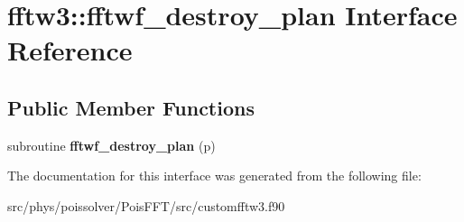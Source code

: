\hypertarget{interfacefftw3_1_1fftwf__destroy__plan}{}\section{fftw3\+:\+:fftwf\+\_\+destroy\+\_\+plan Interface Reference}
\label{interfacefftw3_1_1fftwf__destroy__plan}
\subsection*{Public Member Functions}
\begin{DoxyCompactItemize}
\item 
subroutine {\bfseries fftwf\+\_\+destroy\+\_\+plan} (p)\hypertarget{interfacefftw3_1_1fftwf__destroy__plan_a533e8119a5fcd6a6e9fa0b0e79653a63}{}\label{interfacefftw3_1_1fftwf__destroy__plan_a533e8119a5fcd6a6e9fa0b0e79653a63}

\end{DoxyCompactItemize}


The documentation for this interface was generated from the following file\+:\begin{DoxyCompactItemize}
\item 
src/phys/poissolver/\+Pois\+F\+F\+T/src/customfftw3.\+f90\end{DoxyCompactItemize}
